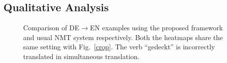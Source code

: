 \subsection{Qualitative Analysis}
\begin{figure}[hptb]
\centering
{}
\caption{\label{deen2}{Comparison of DE$\rightarrow$EN examples using the proposed framework and usual NMT system respectively. Both the heatmaps share the same setting with Fig.~\ref{crop}}. The verb ``gedeckt'' is incorrectly translated in simultaneous translation.}
\end{figure}

